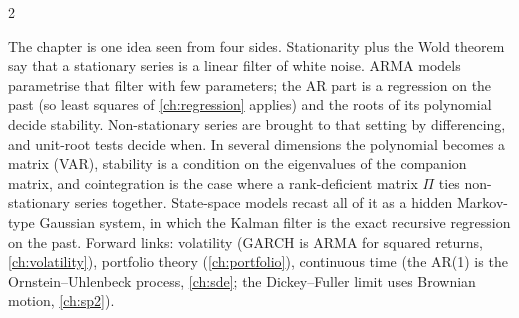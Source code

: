 \begin{paracol}{2}
\begin{intuition}
The chapter is one idea seen from four sides. Stationarity plus the Wold theorem say that a stationary series is a linear filter of white noise. ARMA models parametrise that filter with few
parameters; the AR part is a regression on the past (so least squares of \cref{ch:regression} applies) and the roots of its polynomial decide stability. Non-stationary series are
brought to that setting by differencing, and unit-root tests decide when. In several dimensions the polynomial becomes a matrix (VAR), stability is a condition on the eigenvalues of
the companion matrix, and cointegration is the case where a rank-deficient matrix $\Pi$ ties non-stationary series together. State-space models recast all of it as a hidden Markov-type
Gaussian system, in which the Kalman filter is the exact recursive regression on the past. Forward links: volatility (GARCH is ARMA for squared returns, \cref{ch:volatility}), portfolio
theory (\cref{ch:portfolio}), continuous time (the AR(1) is the Ornstein--Uhlenbeck process, \cref{ch:sde}; the Dickey--Fuller limit uses Brownian motion, \cref{ch:sp2}).
\end{intuition}


\end{paracol}
